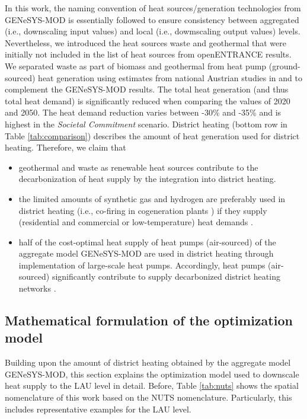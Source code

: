 In this work, the naming convention of heat sources/generation technologies from GENeSYS-MOD is essentially followed to ensure consistency between aggregated (i.e., downscaling input values) and local (i.e., dowmscaling output values) levels. Nevertheless, we introduced the heat sources waste and geothermal that were initially not included in the list of heat sources from openENTRANCE results. We separated waste as part of biomass and geothermal from heat pump (ground-sourced) heat generation using estimates from national Austrian studies in \cite{konighofer2014potenzial} and \cite{buchele2015bewertung} to complement the GENeSYS-MOD results. The total heat generation (and thus total heat demand) is significantly reduced when comparing the values of 2020 and 2050. The heat demand reduction varies between -30\% and -35\% and is highest in the \textit{Societal Commitment} scenario. District heating (bottom row in Table \ref{tab:comparison}) describes the amount of heat generation used for district heating.  Therefore, we claim that

\begin{itemize}
	\item geothermal \cite{weinand2019developing} and waste \cite{fruergaard2010energy} as renewable heat sources contribute to the decarbonization of heat supply by the integration into district heating.
	\item the limited amounts of synthetic gas and hydrogen are preferably used in district heating (i.e., co-firing in cogeneration plants \cite{zwickl2022demystifying}) if they supply (residential and commercial or low-temperature) heat demands \cite{gerhardt2020hydrogen, jensen2020potential, dodds2015hydrogen}.
	\item half of the cost-optimal heat supply of heat pumps (air-sourced) of the aggregate model GENeSYS-MOD are used in district heating through implementation of large-scale heat pumps. Accordingly, heat pumps (air-sourced) significantly contribute to supply decarbonized district heating networks \cite{bach2016integration}. 
\end{itemize}

\subsection{Mathematical formulation of the optimization model}\label{sec:eq}
Building upon the amount of district heating obtained by the aggregate model GENeSYS-MOD, this section explains the optimization model used to downscale heat supply to the LAU level in detail. Before, Table \ref{tab:nuts} shows the spatial nomenclature of this work based on the NUTS nomenclature. Particularly, this includes representative examples for the LAU level. 

